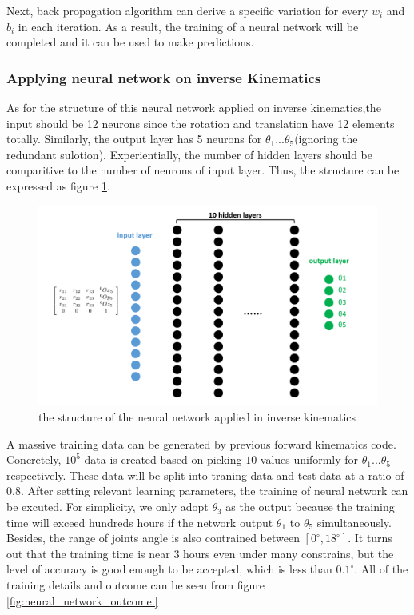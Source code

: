 Next, back propagation algorithm can derive a specific variation for every $w_i$ and $b_i$ in each iteration. As a result, the training of a neural network will be completed and it can be used to make predictions.  

\subsubsection{Applying neural network on inverse Kinematics}
As for the structure of this neural network applied on inverse kinematics,the input should be 12 neurons since the rotation and translation have 12 elements totally. Similarly, the output layer has 5 neurons for $\theta_1...\theta_5$(ignoring the redundant sulotion). Experientially, the number of hidden layers should be comparitive to the number of neurons of input layer. Thus, the structure can be expressed as figure \ref{fig:IK_neural_network}. 

\begin{figure}[htbp] 
\begin{center}
\includegraphics[width=\textwidth]{images/IK_neural_network}
\caption{the structure of the neural network applied in inverse kinematics}
\label{fig:IK_neural_network}
\end{center}
\end{figure}

A massive training data can be generated by previous forward kinematics code. Concretely, $10^5$ data is created based on picking $10$ values uniformly for $\theta_1...\theta_5$ respectively. These data will be split into traning data and test data at a ratio of $0.8$.
After setting relevant learning parameters, the training of neural network can be excuted. For simplicity, we only adopt $\theta_3$ as the output because the training time will exceed hundreds hours if the network output $\theta_1$ to $\theta_5$ simultaneously. Besides, the range of joints angle is also contrained between $[0^{\circ},18^{\circ}]$. 
It turns out that the training time is near 3 hours even under many constrains, but the level of accuracy is good enough to be accepted, which is less than $0.1^{\circ}$. All of the training details and outcome can be seen from figure \ref{fig:neural_network_outcome.}

